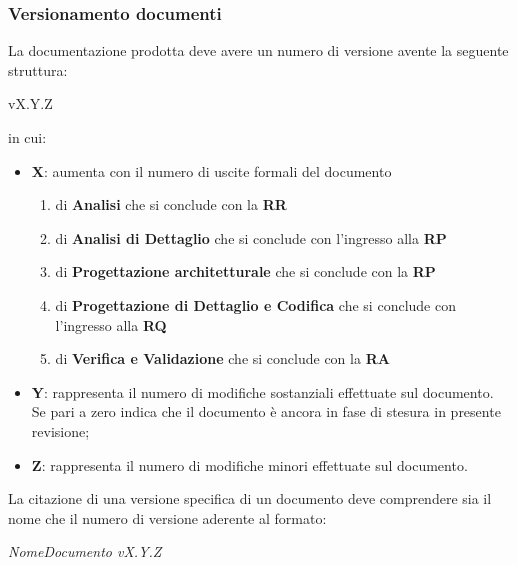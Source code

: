 \documentclass{scalatekids-article}
\begin{document}
\subsubsection{Versionamento documenti}
La documentazione prodotta deve avere un numero di versione avente la seguente struttura:\\
\begin{center}
  vX.Y.Z
\end{center}
in cui:
\begin{itemize}
\item \textbf{X}: aumenta con il numero di uscite formali del documento
  \begin{enumerate}
  \item{} di \textbf{Analisi} che si conclude con la \textbf{RR}
  \item{} di \textbf{Analisi di Dettaglio} che si conclude con l'ingresso alla \textbf{RP}
  \item{} di \textbf{Progettazione architetturale} che si conclude con la \textbf{RP}
  \item{} di \textbf{Progettazione di Dettaglio e Codifica} che si conclude con l'ingresso alla \textbf{RQ}
  \item{} di \textbf{Verifica e Validazione} che si conclude con la \textbf{RA}
  \end{enumerate}
\item \textbf{Y}: rappresenta il numero di modifiche sostanziali effettuate sul documento. Se pari a zero indica che il documento è ancora in fase di stesura in presente revisione;
\item \textbf{Z}: rappresenta il numero di modifiche minori effettuate sul documento.
\end{itemize}
La citazione di una versione specifica di un documento deve comprendere sia il nome che il numero di versione aderente al formato:
\begin{center}
  \textit{NomeDocumento vX.Y.Z}
\end{center}
\end{document}
